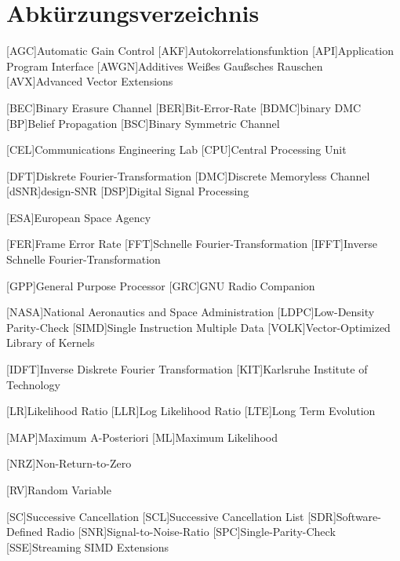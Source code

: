 \chapter{Abkürzungsverzeichnis}
\begin{acronym}[TROLL]
  [AGC]{Automatic Gain Control}
  [AKF]{Autokorrelationsfunktion}
  [API]{Application Program Interface}
  [AWGN]{Additives Weißes Gaußsches Rauschen}
  [AVX]{Advanced Vector Extensions}
  
  [BEC]{Binary Erasure Channel}
  [BER]{Bit-Error-Rate}
  [BDMC]{binary \acs{DMC}}
  [BP]{Belief Propagation}
  [BSC]{Binary Symmetric Channel}
  
  [CEL]{Communications Engineering Lab}
  [CPU]{Central Processing Unit}

  [DFT]{Diskrete Fourier-Transformation}
  [DMC]{Discrete Memoryless Channel}
  [dSNR]{design-\ac{SNR}}
  [DSP]{Digital Signal Processing}
 
  [ESA]{European Space Agency}

  [FER]{Frame Error Rate}
  [FFT]{Schnelle Fourier-Transformation}
  [IFFT]{Inverse Schnelle Fourier-Transformation}
  
  [GPP]{General Purpose Processor}
  [GRC]{GNU Radio Companion}
  
  [NASA]{National Aeronautics and Space Administration}
  [LDPC]{Low-Density Parity-Check}
  [SIMD]{Single Instruction Multiple Data}
  [VOLK]{Vector-Optimized Library of Kernels}

  [IDFT]{Inverse Diskrete Fourier Transformation}
  [KIT]{Karlsruhe Institute of Technology}

  [LR]{Likelihood Ratio}
  [LLR]{Log Likelihood Ratio}
  [LTE]{Long Term Evolution}
 
  [MAP]{Maximum A-Posteriori}
  [ML]{Maximum Likelihood}
 
  [NRZ]{Non-Return-to-Zero}
 
  [RV]{Random Variable}
 
  [SC]{Successive Cancellation}
  [SCL]{Successive Cancellation List}
  [SDR]{Software-Defined Radio}
  [SNR]{Signal-to-Noise-Ratio}
  [SPC]{Single-Parity-Check}
  [SSE]{Streaming SIMD Extensions}


\end{acronym}
